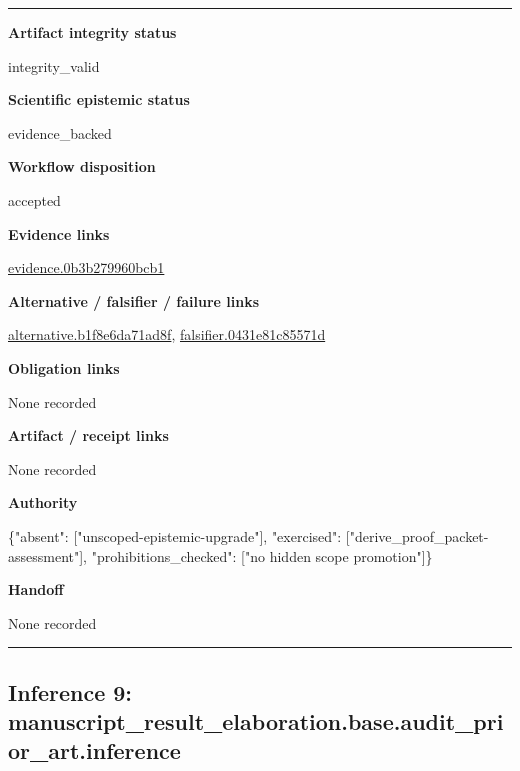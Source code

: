 \documentclass[10pt,a4paper]{article}
\newcommand{\TraceField}[2]{\par\noindent\textbf{#1}\par\noindent #2\par\smallskip}
\newenvironment{TraceDossier}{\par\medskip\noindent\hrule\medskip}{\medskip\hrule\par\medskip}
\begin{document}
\begin{TraceDossier}
\TraceField{Artifact integrity status}{integrity\_\allowbreak{}valid}

\TraceField{Scientific epistemic status}{evidence\_\allowbreak{}backed}

\TraceField{Workflow disposition}{accepted}

\TraceField{Evidence links}{\hyperlink{trace-evidence-06a7ec6351c3546c0b}{evidence.\allowbreak{}0b3b279960\allowbreak{}bcb1}}

\TraceField{Alternative / falsifier / failure links}{\hyperlink{trace-alternative-7dbb326c413d779891}{alternativ\allowbreak{}e.\allowbreak{}b1f8e6da71\allowbreak{}ad8f}, \hyperlink{trace-alternative-611b2a492248105c67}{falsifier.\allowbreak{}0431e81c85\allowbreak{}571d}}

\TraceField{Obligation links}{None recorded}

\TraceField{Artifact / receipt links}{None recorded}

\TraceField{Authority}{\{"absent":\allowbreak{} ["unscoped\allowbreak{}-\allowbreak{}epistemic-\allowbreak{}upgrade"],\allowbreak{} "exercised\allowbreak{}":\allowbreak{} ["derive\_\allowbreak{}proof\_\allowbreak{}packet-\allowbreak{}assessment\allowbreak{}"], "prohibiti\allowbreak{}ons\_\allowbreak{}checked":\allowbreak{} ["no hidden scope promotion"\allowbreak{}]\}}

\TraceField{Handoff}{None recorded}

\end{TraceDossier}
\pagebreak[2]\subsection{Inference 9: manuscript\allowbreak{}\_\allowbreak{}result\_\allowbreak{}elaboratio\allowbreak{}n.\allowbreak{}base.\allowbreak{}audit\_\allowbreak{}prior\_\allowbreak{}art.\allowbreak{}inference}\label{trace-inference-756646e0e1899cd4ea}
\end{document}
